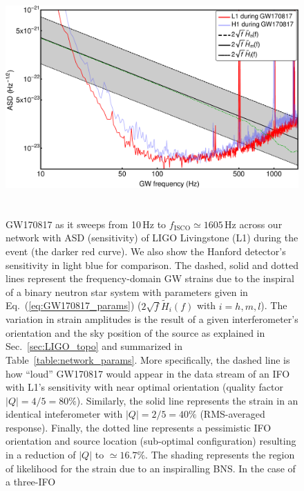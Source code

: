 \documentclass[prd,amsmath,amssymb,aps,floats,amsfonts,notitlepage,superscriptaddress,eqsecnum,nofootinbib,10pt]{revtex4-1}
\begin{document}
\begin{figure}[ht!]
\includegraphics[height=9cm]{../Figures/GW170817_strains.pdf}
\caption{GW170817 as it sweeps from 10\,Hz to $f_\text{ISCO} \simeq1605\,$Hz across our network with ASD (sensitivity) of 
LIGO Livingstone (L1) during the event (the darker red curve).
We also show the Hanford detector's sensitivity in light blue for comparison. The dashed, solid and dotted lines represent the 
frequency-domain GW strains due to the inspiral of
a binary neutron star system with parameters given in Eq.~(\ref{eq:GW170817_params}) ($2\sqrt{f} \tilde{H}_i(f)$ with $i=h,m,l$).
The variation in strain amplitudes is the result of a given interferometer's orientation and the sky position of the source 
as explained in Sec.~\ref{sec:LIGO_topo} and summarized in Table~\ref{table:network_params}.
More specifically, the dashed line is how ``loud'' GW170817 would appear in the data stream of an IFO with L1's sensitivity
with near optimal orientation
(quality factor $|Q|=4/5=80\%$). Similarly, the solid line represents the strain in an identical inteferometer with 
$|Q|=2/5=40\%$ (RMS-averaged response). %
Finally, the dotted line represents a pessimistic IFO orientation and source location (sub-optimal configuration)
resulting in a reduction of $|Q|$ to $\simeq 16.7\%$.
The shading represents the region of likelihood for the strain due to an inspiralling BNS. In the case of a three-IFO
}
\end{figure}
\end{document}
